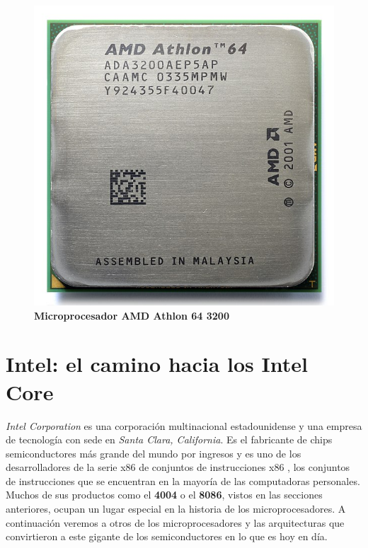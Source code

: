 \begin{figure}[htb]
	\centering
	\includegraphics[scale = 0.15]{Graphics/AMD_Athlon_64_3200+_ADA3200AEP5AP.jpg}
	\caption{\textbf{Microprocesador AMD Athlon 64 3200}}
	\label{fig:20}
\end{figure}
\newpage

\section{Intel: el camino hacia los Intel Core}
\emph{Intel Corporation} es una corporación multinacional estadounidense y una empresa de tecnología con sede en \emph{Santa Clara, California}. 
Es el fabricante de chips semiconductores más grande del mundo por ingresos y es uno de los desarrolladores de la serie x86 
de conjuntos de instrucciones x86 , los conjuntos de instrucciones que se encuentran en la mayoría de las 
computadoras personales. Muchos de sus productos como el \textbf{4004} o el \textbf{8086}, vistos en las secciones anteriores, ocupan un lugar especial 
en la historia de los microprocesadores. A continuación veremos a otros de los microprocesadores y las arquitecturas que convirtieron 
a este gigante de los semiconductores en lo que es hoy en día.

